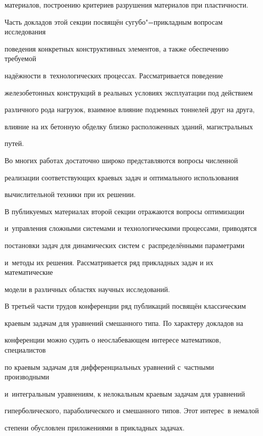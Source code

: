 материалов, построению критериев разрушения материалов при пластичности.



Часть докладов этой секции посвящён сугубо"=прикладным вопросам исследования 

поведения конкретных конструктивных элементов, а также обеспечению требуемой 

надёжности в~технологических процессах. Рассматривается поведение 

железобетонных конструкций в реальных условиях эксплуатации под действием 

различного рода нагрузок, взаимное влияние подземных тоннелей друг на друга, 

влияние на их бетонную обделку близко расположенных зданий, магистральных 

путей. 



Во многих работах достаточно широко представляются вопросы численной 

реализации соответствующих краевых задач и оптимального использования 

вычислительной техники при их решении.



В публикуемых материалах второй секции отражаются вопросы оптимизации 

и~управления сложными системами и технологическими процессами, приводятся 

постановки задач для динамических систем с~распределёнными параметрами 

и~методы их решения. Рассматривается ряд прикладных задач и их математические 

модели в различных областях научных исследований.



В третьей части трудов конференции ряд публикаций посвящён классическим 

краевым задачам для уравнений смешанного типа. По характеру докладов на 

конференции можно судить о неослабевающем интересе математиков, специалистов 

по краевым задачам для дифференциальных уравнений с~частными производными 

и~интегральным уравнениям, к нелокальным краевым задачам для уравнений 

гиперболического, параболического и смешанного типов. Этот интерес~в немалой 

степени обусловлен приложениями в прикладных задачах. 



